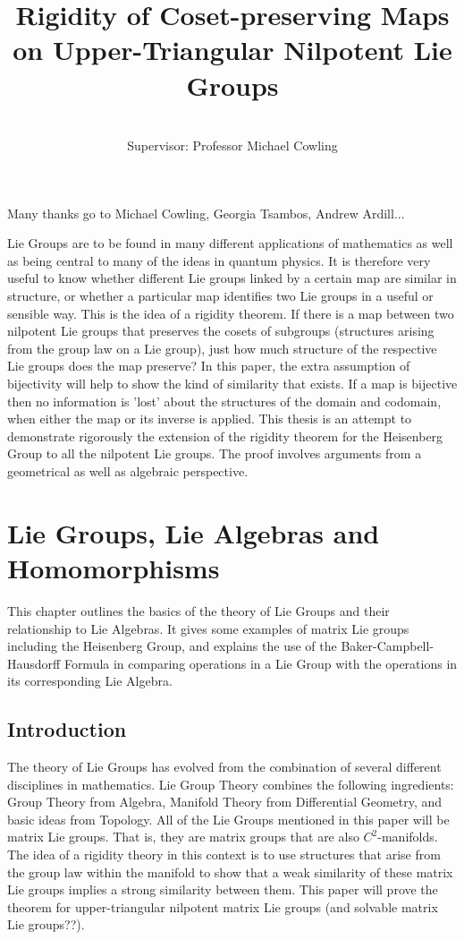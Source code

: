 \documentclass[honours]{UNSWthesis}
\title{Rigidity of Coset-preserving Maps on Upper-Triangular Nilpotent Lie Groups}
\author{\Authornameonly\\{\bigskip}Supervisor: Professor Michael Cowling}
\newcommand{\1}{\mathbf{e}_{1}}
\newcommand{\2}{\mathbf{e}_{3}}
\newcommand{\3}{\mathbf{e}_{3}}
\begin{document}
\maketitle

{\noindent}Many thanks go to Michael Cowling, Georgia Tsambos, Andrew Ardill...


Lie Groups are to be found in many different applications of mathematics as well as being central to many of the ideas in quantum physics. It is therefore very useful to know whether different Lie groups linked by a certain map are similar in structure, or whether a particular map identifies two Lie groups in a useful or sensible way. This is the idea of a rigidity theorem. If there is a map between two nilpotent Lie groups that preserves the cosets of subgroups (structures arising from the group law on a Lie group), just how much structure of the respective Lie groups does the map preserve? In this paper, the extra assumption of bijectivity will help to show the kind of similarity that exists. If a map is bijective then no information is 'lost' about the structures of the domain and codomain, when either the map or its inverse is applied. 
This thesis is an attempt to demonstrate rigorously the extension of the rigidity theorem for the Heisenberg Group to all the nilpotent Lie groups. The proof involves arguments from a geometrical as well as algebraic perspective. 


\chapter{Lie Groups, Lie Algebras and Homomorphisms}
This chapter outlines the basics of the theory of Lie Groups and their relationship to Lie Algebras. It gives some examples of matrix Lie groups including the Heisenberg Group, and explains the use of the Baker-Campbell-Hausdorff Formula in comparing operations in a Lie Group with the operations in its corresponding Lie Algebra. 

\section{Introduction}
The theory of Lie Groups has evolved from the combination of several different disciplines in mathematics. Lie Group Theory combines the following ingredients: Group Theory from Algebra, Manifold Theory from Differential Geometry, and basic ideas from Topology. All of the Lie Groups mentioned in this paper will be matrix Lie groups. That is, they are matrix groups that are also $C^2$-manifolds. The idea of a rigidity theory in this context is to use structures that arise from the group law within the manifold to show that a weak similarity of these matrix Lie groups implies a strong similarity between them. This paper will prove the theorem for upper-triangular nilpotent matrix Lie groups (and solvable matrix Lie groups??).
\end{document}
